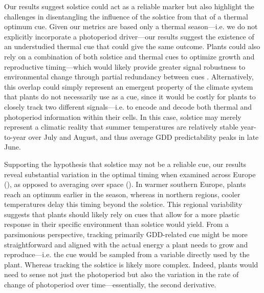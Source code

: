 \documentclass[11pt,letter]{article}
\begin{document}
Our results suggest solstice could act as a reliable marker but also highlight the challenges in disentangling the influence of the solstice from that of a thermal optimum cue. Given our metrics are based only a thermal season---i.e. we do not explicitly incorporate a photoperiod driver---our results suggest the existence of an understudied thermal cue that could give the same outcome.
Plants could also rely on a combination of both solstice and thermal cues to optimize growth and reproductive timing---which would likely provide greater signal robustness to environmental change through partial redundancy between cues \citep{Bonamour2019}.
Alternatively, this overlap could simply represent an emergent property of the climate system that plants do not necessarily use as a cue, since it would be costly for plants to closely track two different signals---i.e. to encode and decode both thermal and photoperiod information within their cells. In this case, solstice may merely represent a climatic reality that summer temperatures are relatively stable year-to-year over July and August, and thus average GDD predictability peaks in late June. 

Supporting the hypothesis that solstice may not be a reliable cue, our results reveal substantial variation in the optimal timing when examined across Europe (), as opposed to averaging over space (). In warmer southern Europe, plants reach an optimum earlier in the season, whereas in northern regions, cooler temperatures delay this timing beyond the solstice. This regional variability suggests that plants should likely rely on cues that allow for a more plastic response in their specific environment than solstice would yield. From a parsimonious perspective, tracking primarily GDD-related cue might be more straightforward and aligned with the actual energy a plant needs to grow and reproduce---i.e. the cue would be sampled from a variable directly used by the plant.
Whereas tracking the solstice is likely more complex. Indeed, plants would need to sense not just the photoperiod but also the variation in the rate of change of photoperiod over time---essentially, the second derivative.
\end{document}

